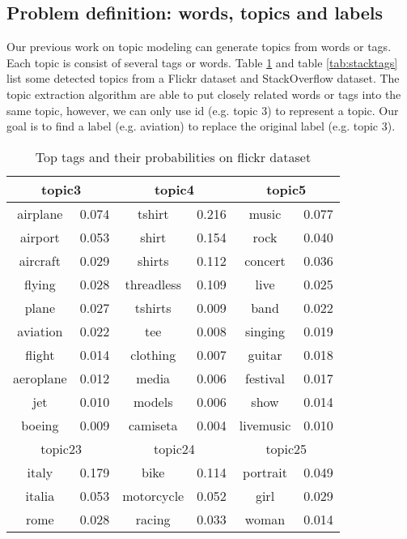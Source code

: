 \subsection{Problem definition: words, topics and labels}
Our previous work on topic modeling can generate topics from words or tags. Each topic is consist of several tags or words. Table \ref{tab:flickrtags} and table \ref{tab:stacktags} list some detected topics from a Flickr dataset and StackOverflow dataset. The topic extraction algorithm are able to put closely related words or tags into the same topic, however, we can only use id (e.g. topic 3) to represent a topic. Our goal is to find a label (e.g. aviation) to replace the original label (e.g. topic 3).



\begin{table}[htp]
\caption{Top tags and their probabilities on flickr dataset}
\label{tab:flickrtags}
\centering
\begin{tabular}{|c|c|c|c|c|c|}
\hline
\multicolumn{2}{|c|}{topic3} & \multicolumn{2}{c|}{topic4} & \multicolumn{2}{c|}{topic5}  \\
\hline
airplane&0.074&tshirt&0.216&music&0.077\\ \hline
airport&0.053&shirt&0.154&rock&0.040\\ \hline
aircraft&0.029&shirts&0.112&concert&0.036\\ \hline
flying&0.028&threadless&0.109&live&0.025\\ \hline
plane&0.027&tshirts&0.009&band&0.022\\ \hline
aviation&0.022&tee&0.008&singing&0.019\\ \hline
flight&0.014&clothing&0.007&guitar&0.018\\ \hline
aeroplane&0.012&media&0.006&festival&0.017\\ \hline
jet&0.010&models&0.006&show&0.014\\ \hline
boeing&0.009&camiseta&0.004&livemusic&0.010\\ \hline
\hline
\multicolumn{2}{|c|}{topic23} & \multicolumn{2}{c|}{topic24} & \multicolumn{2}{c|}{topic25}  \\
\hline
italy&0.179&bike&0.114&portrait&0.049\\ \hline
italia&0.053&motorcycle&0.052&girl&0.029\\ \hline
rome&0.028&racing&0.033&woman&0.014\\ \hline

\end{tabular}
\end{table}
